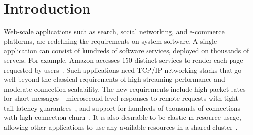 
\section{Introduction}
\label{sec:intro}



Web-scale applications such as search, social networking, and
e-commerce platforms, are redefining the requirements on system
software. A single application can consist of hundreds of software
services, deployed on thousands of servers. For example, Amazon
accesses 150 distinct services to render each page requested by
users~\cite{DBLP:conf/sosp/DeCandiaHJKLPSVV07}. Such applications need
TCP/IP networking stacks that go well beyond the classical
requirements of high streaming performance and moderate connection
scalability. The new requirements include high packet rates for short
messages~\cite{Atikoglu:2012:WAL}, microsecond-level responses to
remote requests with tight tail latency
guarantees~\cite{DBLP:journals/cacm/DeanB13}, and support for hundreds
of thousands of connections with high connection
churn~\cite{nishtala2013scaling}. It is also desirable to be elastic
in resource usage, allowing other applications to use any available
resources in a shared
cluster~\cite{DBLP:journals/computer/BarrosoH0,Leverich:RHSU:2014}.



